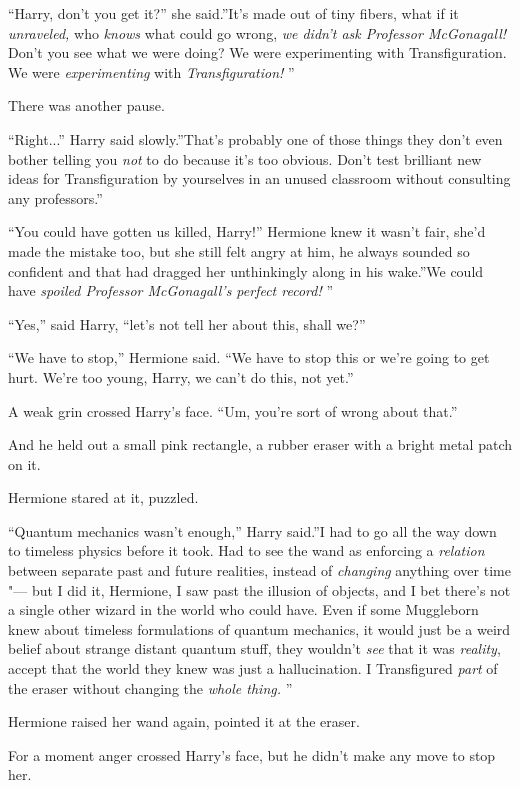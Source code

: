 ``Harry, don't you get it?'' she said.''It's made out of tiny fibers,
what if it \emph{unraveled,} who \emph{knows} what could go wrong,
\emph{we didn't ask Professor McGonagall!} Don't you see what we were
doing? We were experimenting with Transfiguration. We were
\emph{experimenting} with \emph{Transfiguration!} ''

There was another pause.

``Right...'' Harry said slowly.''That's probably one of those
things they don't even bother telling you \emph{not} to do because it's
too obvious. Don't test brilliant new ideas for Transfiguration by
yourselves in an unused classroom without consulting any professors.''

``You could have gotten us killed, Harry!'' Hermione knew it wasn't
fair, she'd made the mistake too, but she still felt angry at him, he
always sounded so confident and that had dragged her unthinkingly along
in his wake.''We could have \emph{spoiled Professor McGonagall's perfect
record!} ''

``Yes,'' said Harry, ``let's not tell her about this, shall we?''

``We have to stop,'' Hermione said. ``We have to stop this or we're
going to get hurt. We're too young, Harry, we can't do this, not yet.''

A weak grin crossed Harry's face. ``Um, you're sort of wrong about
that.''

And he held out a small pink rectangle, a rubber eraser with a bright
metal patch on it.

Hermione stared at it, puzzled.

``Quantum mechanics wasn't enough,'' Harry said.''I had to go all the
way down to timeless physics before it took. Had to see the wand as
enforcing a \emph{relation} between separate past and future realities,
instead of \emph{changing} anything over time "--- but I did it, Hermione,
I saw past the illusion of objects, and I bet there's not a single other
wizard in the world who could have. Even if some Muggleborn knew about
timeless formulations of quantum mechanics, it would just be a weird
belief about strange distant quantum stuff, they wouldn't \emph{see}
that it was \emph{reality}, accept that the world they knew was just a
hallucination. I Transfigured \emph{part} of the eraser without changing
the \emph{whole thing.} ''

Hermione raised her wand again, pointed it at the eraser.

For a moment anger crossed Harry's face, but he didn't make any move to
stop her.

